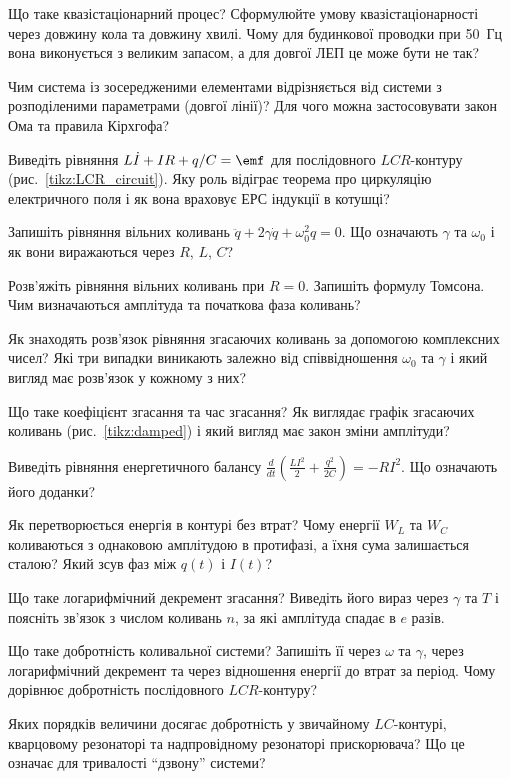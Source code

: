 \begin{Questions}
\begin{quizlist}
	\item Що таке квазістаціонарний процес? Сформулюйте умову квазістаціонарності через довжину кола та довжину хвилі. Чому для будинкової проводки при 50~Гц вона виконується з великим запасом, а для довгої ЛЕП це може бути не так?
	\item Чим система із зосередженими елементами відрізняється від системи з розподіленими параметрами (довгої лінії)? Для чого можна застосовувати закон Ома та правила Кірхгофа?
	\item Виведіть рівняння $L\dot I + IR + q/C = \emf$ для послідовного $LCR$-контуру (рис.~\ref{tikz:LCR_circuit}). Яку роль відіграє теорема про циркуляцію електричного поля і як вона враховує ЕРС індукції в котушці?
	\item Запишіть рівняння вільних коливань $\ddot q + 2\gamma\dot q + \omega_0^2 q = 0$. Що означають $\gamma$ та $\omega_0$ і як вони виражаються через $R$, $L$, $C$?
	\item Розв'яжіть рівняння вільних коливань при $R=0$. Запишіть формулу Томсона. Чим визначаються амплітуда та початкова фаза коливань?
	\item Як знаходять розв'язок рівняння згасаючих коливань за допомогою комплексних чисел? Які три випадки виникають залежно від співвідношення $\omega_0$ та $\gamma$ і який вигляд має розв'язок у кожному з них?
	\item Що таке коефіцієнт згасання та час згасання? Як виглядає графік згасаючих коливань (рис.~\ref{tikz:damped}) і який вигляд має закон зміни амплітуди?
	\item Виведіть рівняння енергетичного балансу $\frac{d}{dt}\left(\frac{LI^2}{2}+\frac{q^2}{2C}\right) = -RI^2$. Що означають його доданки?
	\item Як перетворюється енергія в контурі без втрат? Чому енергії $W_L$ та $W_C$ коливаються з однаковою амплітудою в протифазі, а їхня сума залишається сталою? Який зсув фаз між $q(t)$ і $I(t)$?
	\item Що таке логарифмічний декремент згасання? Виведіть його вираз через $\gamma$ та $T$ і поясніть зв'язок з числом коливань $n$, за які амплітуда спадає в $e$ разів.
	\item Що таке добротність коливальної системи? Запишіть її через $\omega$ та $\gamma$, через логарифмічний декремент та через відношення енергії до втрат за період. Чому дорівнює добротність послідовного $LCR$-контуру?
	\item Яких порядків величини досягає добротність у звичайному $LC$-контурі, кварцовому резонаторі та надпровідному резонаторі прискорювача? Що це означає для тривалості \enquote{дзвону} системи?

\end{quizlist}
\end{Questions}
